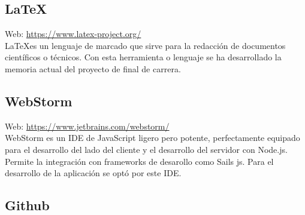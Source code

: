 \subsection{\LaTeX}

Web: \url{https://www.latex-project.org/}\\

\LaTeX es un lenguaje de marcado que sirve para la redacción de documentos científicos o técnicos. Con esta herramienta o lenguaje se ha desarrollado la memoria actual del proyecto de final de carrera.



\subsection{WebStorm}


Web: \url{https://www.jetbrains.com/webstorm/}\\

WebStorm es un IDE de JavaScript ligero pero potente, perfectamente equipado para el desarrollo del lado del cliente y el desarrollo del servidor con Node.js. Permite la integración con frameworks de desarollo como Sails js. Para el desarrollo de la aplicación se optó por este IDE. \\

\subsection{Github}


